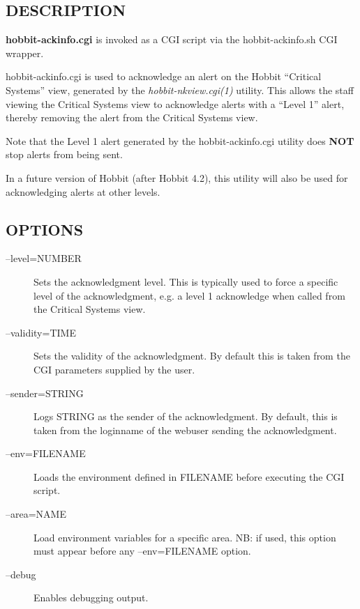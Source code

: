  
\subsection{DESCRIPTION}
\textbf{hobbit-ackinfo.cgi}
 is invoked as a CGI script via the hobbit-ackinfo.sh CGI wrapper. 

  hobbit-ackinfo.cgi is used to acknowledge an alert on the Hobbit
  ``Critical Systems'' view, generated by the
  \emph{hobbit-nkview.cgi(1)} utility. This allows the staff viewing
  the Critical Systems view to acknowledge alerts with a ``Level 1''
  alert, thereby removing the alert from the Critical Systems view. 



  Note that the Level 1 alert generated by the hobbit-ackinfo.cgi
  utility does \textbf{NOT} stop alerts from being sent. 



  In a future version of Hobbit (after Hobbit 4.2), this utility will
  also be used for acknowledging alerts at other levels. 



 
\subsection{OPTIONS}
\begin{description}
\item[--level=NUMBER] Sets the acknowledgment level. This is typically
  used to force a specific level of the acknowledgment, e.g. a level 1
  acknowledge when called from the Critical Systems view. 


 

\item[--validity=TIME] Sets the validity of the acknowledgment. By
  default this is taken from the CGI parameters supplied by the user. 


 

\item[--sender=STRING] Logs STRING as the sender of the
  acknowledgment. By default, this is taken from the loginname of the
  webuser sending the acknowledgment. 


 

\item[--env=FILENAME] Loads the environment defined in FILENAME before executing the CGI script. 

 

\item[--area=NAME] Load environment variables for a specific area. NB:
  if used, this option must appear before any --env=FILENAME option. 


 

\item[--debug] Enables debugging output. 


\end{description}
